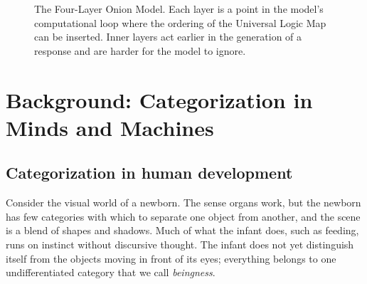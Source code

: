 \documentclass[twocolumn]{ulpaper}
\begin{document}
\begin{figure}[t]
\centering
{}
\caption{The Four-Layer Onion Model. Each layer is a point in the model's computational loop where the ordering of the Universal Logic Map can be inserted. Inner layers act earlier in the generation of a response and are harder for the model to ignore.}
\label{fig:onion}
\end{figure}

\section{Background: Categorization in Minds and Machines}
\label{sec:background}

\subsection{Categorization in human development}

Consider the visual world of a newborn. The sense organs work, but the newborn has few categories with which to separate one object from another, and the scene is a blend of shapes and shadows. Much of what the infant does, such as feeding, runs on instinct without discursive thought. The infant does not yet distinguish itself from the objects moving in front of its eyes; everything belongs to one undifferentiated category that we call \emph{beingness}.
\end{document}
